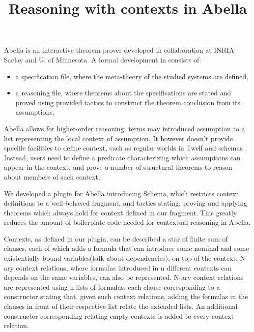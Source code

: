 \documentclass[nocopyrightspace,authoryear]{sigplanconf}
\title{Reasoning with contexts in Abella}
\begin{document}
\maketitle
Abella \cite{abellasys} is an interactive theorem prover developed in collaboration at INRIA Saclay and U. of Minnesota. A formal development in consists of:
\begin{itemize}
\item a specification file, where the meta-theory of the studied systems are defined,
\item a reasoning file, where theorems about the specifications are stated and proved using provided tactics to construct the theorem conclusion from its assumptions.
\end{itemize}

Abella allows for higher-order reasoning; terms may introduced assumption to a list representing the local context of assumption. It however doesn't provide specific facilities to define context, such as regular worlds in Twelf \cite{twelfsys} and schemas \cite{belugasys}. Instead, users need to define a predicate characterizing which assumptions can appear in the context, and prove a number of structural theorems to reason about members of such context.


We developed a plugin for Abella introducing Schema, which restricts context definitions to a well-behaved fragment, and tactics stating, proving and applying theorems which always hold for context defined in our fragment. This greatly reduces the amount of boilerplate code needed for contextual reasoning in Abella. 

Contexts, as defined in our plugin, can be described a star of finite sum of clauses, each of which adds a formula that can introduce some nominal and some existentially bound variables(talk about dependencies),  on top of the context. N-ary context relations, where formulas introduced in  n different contexts can depends on the same variables, can also be represented. N-ary context relations are represented using n lists of formulas, each clause corresponding to a constructor stating that, given such context relations, adding the formulas in the clauses in front of their respective list relate the extended lists. An additional constructor corresponding relating empty contexts is added to every context relation.
\end{document}
